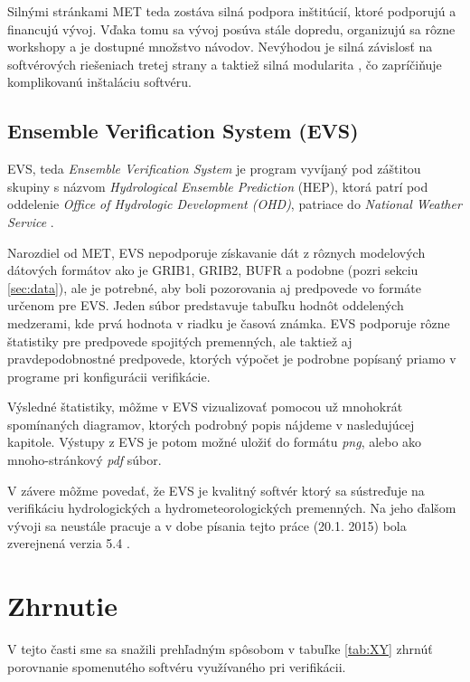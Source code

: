 Silnými stránkami MET teda zostáva silná podpora inštitúcií, ktoré podporujú a financujú vývoj. Vďaka tomu sa vývoj posúva stále dopredu, organizujú sa rôzne workshopy a je dostupné množstvo návodov. Nevýhodou je silná závislosť na softvérových riešeniach tretej strany a taktiež silná modularita , čo zapríčiňuje komplikovanú inštaláciu softvéru.

\subsection[EVS]{Ensemble Verification System (EVS)}
EVS, teda \textit{Ensemble Verification System} \cite{EVS} je program vyvíjaný pod záštitou skupiny s názvom \textit{Hydrological Ensemble Prediction} (HEP), ktorá patrí pod oddelenie \textit{Office of Hydrologic Development (OHD)}, patriace do \textit{National Weather Service} \cite{EVSmanual}.

Narozdiel od MET, EVS nepodporuje získavanie dát z rôznych modelových dátových formátov ako je GRIB1, GRIB2, BUFR a podobne (pozri sekciu \ref{sec:data}), ale je potrebné, aby boli pozorovania aj predpovede vo formáte určenom pre EVS. Jeden súbor predstavuje tabuľku hodnôt oddelených medzerami, kde prvá hodnota v riadku je časová známka. EVS podporuje rôzne štatistiky pre predpovede spojitých premenných, ale taktiež aj pravdepodobnostné predpovede, ktorých výpočet je podrobne popísaný priamo v programe pri konfigurácii verifikácie.

Výsledné štatistiky, môžme v EVS vizualizovať pomocou už mnohokrát spomínaných diagramov, ktorých podrobný popis nájdeme v nasledujúcej kapitole. Výstupy z EVS je potom možné uložiť do formátu \textit{png}, alebo ako mnoho-stránkový \textit{pdf} súbor.

V závere môžme povedať, že EVS je kvalitný softvér ktorý sa sústreďuje na verifikáciu hydrologických a hydrometeorologických premenných. Na jeho ďalšom vývoji sa neustále pracuje a v dobe písania tejto práce (20.1. 2015) bola zverejnená verzia 5.4 \cite{EVS}.


\section{Zhrnutie}
V tejto časti sme sa snažili prehľadným spôsobom v tabuľke \ref{tab:XY} zhrnúť porovnanie spomenutého softvéru využívaného pri verifikácii.

